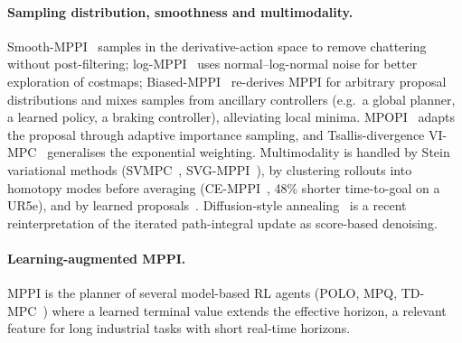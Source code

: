 \paragraph{Sampling distribution, smoothness and multimodality.} Smooth-MPPI~\cite{kim2022smppi} samples in the derivative-action space to remove chattering without post-filtering; log-MPPI~\cite{mohamed2022logmppi} uses normal--log-normal noise for better exploration of costmaps; Biased-MPPI~\cite{trevisan2024biasedmppi} re-derives MPPI for arbitrary proposal distributions and mixes samples from ancillary controllers (e.g.\ a global planner, a learned policy, a braking controller), alleviating local minima. MPOPI~\cite{asmar2023mpopi} adapts the proposal through adaptive importance sampling, and Tsallis-divergence VI-MPC~\cite{wang2021tsallis} generalises the exponential weighting. Multimodality is handled by Stein variational methods (SVMPC~\cite{lambert2020svmpc}, SVG-MPPI~\cite{honda2024svgmppi}), by clustering rollouts into homotopy modes before averaging (CE-MPPI~\cite{liu2026clusteringmppi}, 48\% shorter time-to-goal on a UR5e), and by learned proposals~\cite{sacks2023learningsampling}. Diffusion-style annealing~\cite{xue2025dialmpc,pan2024mbd} is a recent reinterpretation of the iterated path-integral update as score-based denoising.

\paragraph{Learning-augmented MPPI.} MPPI is the planner of several model-based RL agents (POLO, MPQ, TD-MPC~\cite{lowrey2019polo,bhardwaj2020mpq,hansen2022tdmpc}) where a learned terminal value extends the effective horizon, a relevant feature for long industrial tasks with short real-time horizons.

